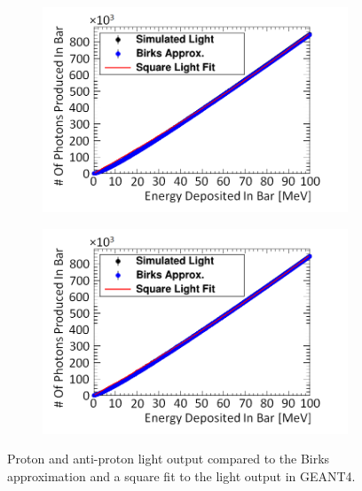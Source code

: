 \begin{figure}[!h]
\centering
\begin{subfigure}{.5\textwidth}
  \centering
  \includegraphics[width=\linewidth]{Chapter4/Figs/protonBirksSlab_simAndApproxLightMedText.png}
  \captionsetup{width=.9\linewidth}
  \caption{}
  \label{subFig:proton_light}
\end{subfigure}%
\begin{subfigure}{.5\textwidth}
  \centering
  \includegraphics[width=\linewidth]{Chapter4/Figs/aProtonBirksSlab_simAndApproxLightMedText.png}
  \captionsetup{width=.9\linewidth}
  \caption{}
  \label{subFig:aproton_light}
\end{subfigure}
\caption{Proton and anti-proton light output compared to the Birks approximation and a square fit to the light output in GEANT4.}
\label{fig:proton_aproton_light}
\end{figure}

